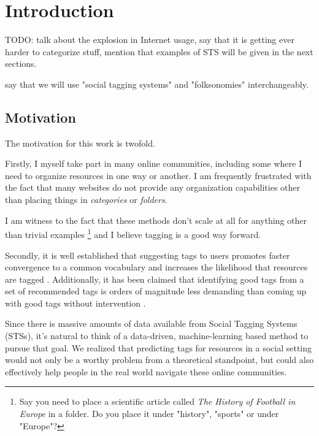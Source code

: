 \chapter{Introduction}\label{chap:intro}

{\color{red} TODO: talk about the explosion in Internet usage, say that it is getting ever harder to categorize stuff, mention that examples of STS will be given in the next sections.

say that we will use "social tagging systems" and "folksonomies" interchangeably. }

\section{Motivation}\label{section:intro_motivation}

The motivation for this work is twofold. 

Firstly, I myself take part in many online communities, including some where I need to organize resources in one way or another. I am frequently frustrated with the fact that many websites do not provide any organization capabilities other than placing things in \textit{categories} or \textit{folders}.

I am witness to the fact that these methods don't scale at all for anything other than trivial examples \footnote{Say you need to place a scientific article called \textit{The History of Football in Europe} in a folder. Do you place it under "history", "sports" or under "Europe"?} and I believe tagging is a good way forward.

Secondly, it is well established that suggesting tags to users promotes faster convergence to a common vocabulary \citep{marlow_etal_2006,hassan_etal_2009, dattolo_etal_2010} and increases the likelihood that resources are tagged \citep{dattolo_etal_2010,floeck_etal_2010}. Additionally, it has been claimed that identifying good tags from a set of recommended tags is orders of magnitude less demanding than coming up with good tags without intervention \citep{marinho_etal_2012}.

Since there is massive amounts of data available from Social Tagging Systems (STSs), it's natural to think of a data-driven, machine-learning based method to pursue that goal. We realized that predicting tags for resources in a social setting would not only be a worthy problem from a theoretical standpoint, but could also effectively help people in the real world navigate these online communities.

